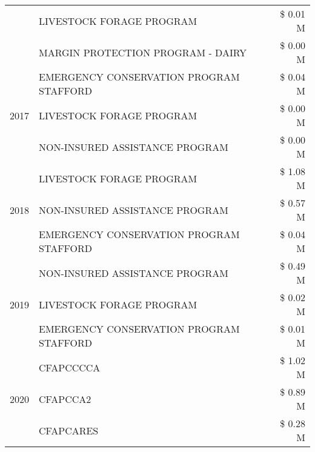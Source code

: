 \begin{tabular}{llr}
 & LIVESTOCK FORAGE PROGRAM                      & \$ 0.01 M \\
 & MARGIN PROTECTION PROGRAM - DAIRY             & \$ 0.00 M \\
\cline{1-3}
\multirow[t]{3}{*}{2017} & EMERGENCY CONSERVATION PROGRAM STAFFORD & \$ 0.04 M \\
 & LIVESTOCK FORAGE PROGRAM & \$ 0.00 M \\
 & NON-INSURED ASSISTANCE PROGRAM & \$ 0.00 M \\
\cline{1-3}
\multirow[t]{3}{*}{2018} & LIVESTOCK FORAGE PROGRAM & \$ 1.08 M \\
 & NON-INSURED ASSISTANCE PROGRAM & \$ 0.57 M \\
 & EMERGENCY CONSERVATION PROGRAM STAFFORD & \$ 0.04 M \\
\cline{1-3}
\multirow[t]{3}{*}{2019} & NON-INSURED ASSISTANCE PROGRAM & \$ 0.49 M \\
 & LIVESTOCK FORAGE PROGRAM & \$ 0.02 M \\
 & EMERGENCY CONSERVATION PROGRAM STAFFORD & \$ 0.01 M \\
\cline{1-3}
\multirow[t]{3}{*}{2020} & CFAPCCCCA & \$ 1.02 M \\
 & CFAPCCA2 & \$ 0.89 M \\
 & CFAPCARES & \$ 0.28 M \\
\cline{1-3}
\bottomrule
\end{tabular}
